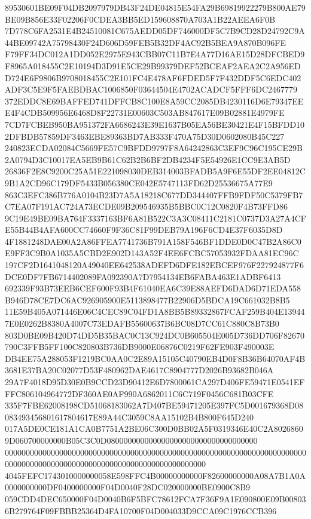 \documentclass[UTF8,fontset=fandol,zihao=-4,a4paper]{ctexart}
\begin{document}
{{89530601BE09F04DB2097979DB43F24DE04815E54FA29B69819922279B800AE79BE09B856E33F02206F0CDEA3BB5ED159608870A703A1B22AEEA6F0B
7D778C6FA2531E4B24510081C675AEDD05DF746000DF5C7B9CD28D24792C9A44BE09742A75798430F24D606D59FEB5B32DF4AC92B5BEA9A870B096FE
F79FF34DC012A1DD052E2975E943CBB07C11B7E4A77D16AE15D28DFCBED9F8965A018455C2E10194D3D91E5CE29B99379DEF52BCEAF2AEA2C2A956ED
D724E6F9806B9708018455C2E101FC4E478AF6FDED5F7F432DDF5C6EDC402ADF3C5E9F5FAEBDBAC1006850F03644504E4702ACADCF5FFF6DC2467779
372EDDC8E69BAFFED741DFFCB8C100E8A59CC2085DB4230116D6E79347EEE4F4CDB509956E6468D8F22731E00603C503AB847617E09B02881E4979FE
7CD7FCBEB950BA951372FA6686243E39E1637B05EA56BE30421E4F15BFDD102DFBDB57859DF3463EBE89363BD7AB333F470A75D30D0602080B45C227
240823ECDA02084C5669FE57C9BFDD9797F8A64242863C3EF9C96C195CE29B2A0794D3C10017EA5EB9B61C62B2B6BF2DB4234F5E54926E1CC9E3AB5D
26836F2E8C9200C25A51E221098030DEB314003BFADB5A9F6E55DF2EE04812C9B1A2CD96C179DF5433B056380CE042E5747113FD62D25536675A77E9
863C3EFC386B776A0104B23D7A5A18218C677DD344407FFB9FDF50C5379FB7C7EA07F191AC724A73ECDE09B209546935B5BBC0C12C0820F4B73FFD86
9C19E49BE09BA764F3337163BF6A81B522C3A3C08411C2181C0737D3A27A4CFE55B44B4AFA600CC74660F9F36C81F99DEB79A196F6CD4E37F6035D8D
4F1881248DAE00A2A86FFEA7741736B791A158F546BF1DDE0D0C47B2A86C0E9FF3C9B0A1035A5CBD2E902D143A52F4EE6FCBC57053932FDAA81EC96C
197CF2D1641048120A49040EE642538ADEFD6DFE182EBCEF976F227924877F6DCE0DF7FB6714402089FA092390A7D7954134EB6FABA463E1ADBF6413
692339F93B73EEB6CEF600F93B4F61040EA6C39E88AEFD6DAD6D71EDA558B946D78CE7DC6AC926905900E5113898477B22906D5BDCA19C661032B8B5
11E59B405A071446E06C4CEC89C04FD1A8BB5B89332867FCAF259B404E139447E0E0262B8380A4007C73EDAFB55600637B6BC08D7CC61C880C8B73B0
803D0BE09B420D74DD5B35BAC0C13C924DC0B605504E005D736DD706F82670790C3FFB5FF100C820803B736DB9000E06876C0219F62FE903F490003E
DB4EE75A288053F1219BC0AA0C2E89A15105C40790EB4D0F8B36B64070AF4B3681E37BA20C02077D53F480962DAE4617C8904777D2026B93682B046A
29A7F4018D95D30E0B9CCD23D90412E6D7800061CA297D406FE59471E0541EFFFC806104964772DF360AE0AF990A6862011C6C719F0456C681B03CFE
335F7FBE62008198CD51068183062A7D407BE59471205E397FC5D001679368D08083493456801617804617E89A44C3059C8AA15102B4B800F645D240
017A5DE0CE181A1CA0B7751A2BE06C300D0BB02A5F0319346E40C2A80268609D060700000000B05C3C0D080000000000000000000000000000000000
000000000000000000000000000000000000000000000000000000000000000000000000000000000000000000000000000000000000000000000000
4045FEFC1743010000000058E598FFC4B00000000000F82600000000A08A7B1A0A0000000000DF0400000000F04D0040F28DC020000000BE0900C8B9
059CDD4DEC650000F04D0040B6F5BFC78612FCA7F36F9A1E090800E09B008036B279764F09FBBB25364D4FA10700F04D004033D9CCA09C1976CCB396
}}
\end{document}
